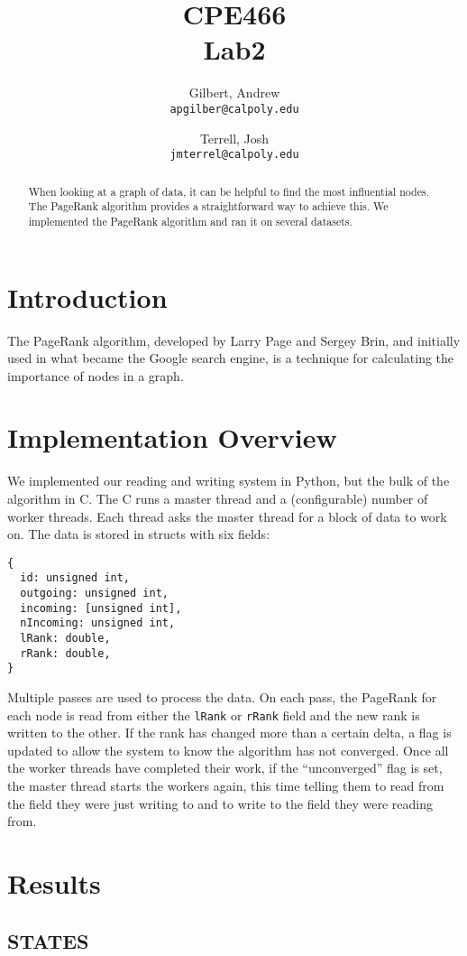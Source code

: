 \documentclass{report}
\title{CPE466\\Lab2}
\author{
  Gilbert, Andrew\\
  \texttt{apgilber@calpoly.edu}
  \and
  Terrell, Josh\\
  \texttt{jmterrel@calpoly.edu}
}
\date{}
\begin{document}
\maketitle

\begin{abstract}
  When looking at a graph of data, it can be helpful to find the most
influential nodes. The PageRank algorithm provides a straightforward
way to achieve this. We implemented the PageRank algorithm and ran it
on several datasets.
\end{abstract}

\section{Introduction}
The PageRank algorithm, developed by Larry Page and Sergey Brin, and initially used in what became the Google search engine, is a technique for calculating the importance of nodes in a graph.



\section{Implementation Overview}
We implemented our reading and writing system in Python, but the bulk of the algorithm in C. The C runs a master thread and a (configurable) number of worker threads. Each thread asks the master thread for a block of data to work on. The data is stored in structs with six fields:
\begin{lstlisting}[lang=ANSI]
{
  id: unsigned int,
  outgoing: unsigned int,
  incoming: [unsigned int],
  nIncoming: unsigned int,
  lRank: double,
  rRank: double,
}
\end{lstlisting}
Multiple passes are used to process the data. On each pass, the
PageRank for each node is read from either the \texttt{lRank} or
\texttt{rRank} field and the new rank is written to the other. If the
rank has changed more than a certain delta, a flag is updated to allow
the system to know the algorithm has not converged. Once all the
worker threads have completed their work, if the ``unconverged'' flag
is set, the master thread starts the workers again, this time telling
them to read from the field they were just writing to and to write to
the field they were reading from.

\section{Results}
\subsection{STATES}
\end{document}
